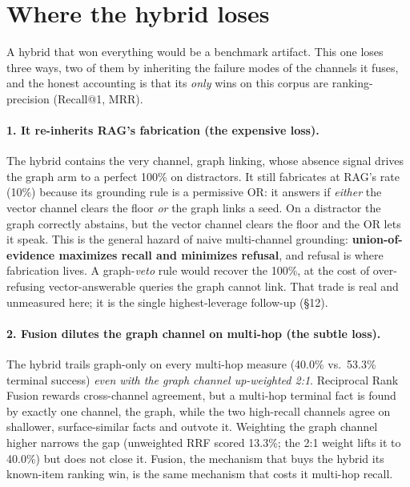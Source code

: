 \documentclass[11pt]{article}
\begin{document}
\section{Where the hybrid loses}
A hybrid that won everything would be a benchmark artifact. This one loses three ways, two of
them by inheriting the failure modes of the channels it fuses, and the honest accounting is
that its \emph{only} wins on this corpus are ranking-precision (Recall@1, MRR).

\paragraph{1. It re-inherits RAG's fabrication (the expensive loss).} The hybrid contains the
very channel, graph linking, whose absence signal drives the graph arm to a perfect 100\%
on distractors. It still fabricates at RAG's rate (10\%) because its grounding rule is a
permissive OR: it answers if \emph{either} the vector channel clears the floor \emph{or} the
graph links a seed. On a distractor the graph correctly abstains, but the vector channel
clears the floor and the OR lets it speak. This is the general hazard of naive multi-channel
grounding: \textbf{union-of-evidence maximizes recall and minimizes refusal}, and refusal is
where fabrication lives. A graph-\emph{veto} rule would recover the 100\%, at the cost of
over-refusing vector-answerable queries the graph cannot link. That trade is real and
unmeasured here; it is the single highest-leverage follow-up (\S12).

\paragraph{2. Fusion dilutes the graph channel on multi-hop (the subtle loss).} The hybrid
trails graph-only on every multi-hop measure (40.0\% vs.\ 53.3\% terminal success) \emph{even
with the graph channel up-weighted 2:1}. Reciprocal Rank Fusion rewards cross-channel
agreement, but a multi-hop terminal fact is found by exactly one channel, the graph, while
the two high-recall channels agree on shallower, surface-similar facts and outvote it.
Weighting the graph channel higher narrows the gap (unweighted RRF scored 13.3\%; the 2:1
weight lifts it to 40.0\%) but does not close it. Fusion, the mechanism that buys the hybrid
its known-item ranking win, is the same mechanism that costs it multi-hop recall.
\end{document}
